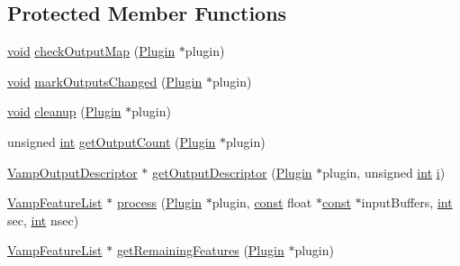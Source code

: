 \subsection*{Protected Member Functions}
\begin{DoxyCompactItemize}
\item 
\hyperlink{sound_8c_ae35f5844602719cf66324f4de2a658b3}{void} \hyperlink{class_vamp_1_1_plugin_adapter_base_1_1_impl_a8274f19566392f843cbf5f745308fd2c}{check\+Output\+Map} (\hyperlink{class_vamp_1_1_plugin}{Plugin} $\ast$plugin)
\item 
\hyperlink{sound_8c_ae35f5844602719cf66324f4de2a658b3}{void} \hyperlink{class_vamp_1_1_plugin_adapter_base_1_1_impl_a8d38dad9a1161e3b16c6f14c0fdab166}{mark\+Outputs\+Changed} (\hyperlink{class_vamp_1_1_plugin}{Plugin} $\ast$plugin)
\item 
\hyperlink{sound_8c_ae35f5844602719cf66324f4de2a658b3}{void} \hyperlink{class_vamp_1_1_plugin_adapter_base_1_1_impl_ab4199ab4a8ba40098aac387032c52aa4}{cleanup} (\hyperlink{class_vamp_1_1_plugin}{Plugin} $\ast$plugin)
\item 
unsigned \hyperlink{xmltok_8h_a5a0d4a5641ce434f1d23533f2b2e6653}{int} \hyperlink{class_vamp_1_1_plugin_adapter_base_1_1_impl_a17af6e67c075bfb9b5069c51c7861e64}{get\+Output\+Count} (\hyperlink{class_vamp_1_1_plugin}{Plugin} $\ast$plugin)
\item 
\hyperlink{vamp_8h_aa8429dd9c60d65800c58574c2b06bf66}{Vamp\+Output\+Descriptor} $\ast$ \hyperlink{class_vamp_1_1_plugin_adapter_base_1_1_impl_a088345ac72041e44e18b7bf5edd32f44}{get\+Output\+Descriptor} (\hyperlink{class_vamp_1_1_plugin}{Plugin} $\ast$plugin, unsigned \hyperlink{xmltok_8h_a5a0d4a5641ce434f1d23533f2b2e6653}{int} \hyperlink{checksum_8c_ab80e330a3bc9e38c1297fe17381e92b4}{i})
\item 
\hyperlink{vamp_8h_a5f257e3f8b5ca1ca4c159d486e219078}{Vamp\+Feature\+List} $\ast$ \hyperlink{class_vamp_1_1_plugin_adapter_base_1_1_impl_a0eca18a4ae046e4ac1ebd25bb3ac5a08}{process} (\hyperlink{class_vamp_1_1_plugin}{Plugin} $\ast$plugin, \hyperlink{getopt1_8c_a2c212835823e3c54a8ab6d95c652660e}{const} float $\ast$\hyperlink{getopt1_8c_a2c212835823e3c54a8ab6d95c652660e}{const} $\ast$input\+Buffers, \hyperlink{xmltok_8h_a5a0d4a5641ce434f1d23533f2b2e6653}{int} sec, \hyperlink{xmltok_8h_a5a0d4a5641ce434f1d23533f2b2e6653}{int} nsec)
\item 
\hyperlink{vamp_8h_a5f257e3f8b5ca1ca4c159d486e219078}{Vamp\+Feature\+List} $\ast$ \hyperlink{class_vamp_1_1_plugin_adapter_base_1_1_impl_a9fe7df06eb951c259763d56c49544676}{get\+Remaining\+Features} (\hyperlink{class_vamp_1_1_plugin}{Plugin} $\ast$plugin)

\end{DoxyCompactItemize}
